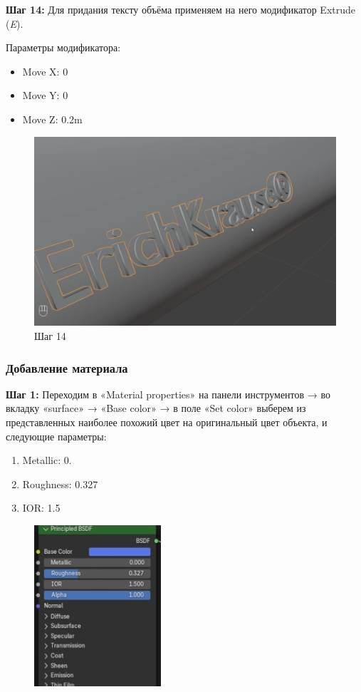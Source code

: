 \documentclass[areasetadvanced]{scrartcl}
\begin{document}
\par \textbf{Шаг 14:} Для придания тексту объёма применяем на него модификатор Extrude (\textit{E}).
\par Параметры модификатора:
\begin{itemize}
    \item Move X: 0
    \item Move Y: 0
    \item Move Z: 0.2m
\end{itemize}

\begin{figure}[H]
    \label{4} 
    \centering
    \includegraphics[width=0.6\linewidth]{col/14.png}
    \caption{Шаг 14}
\end{figure}

\subsubsection{Добавление материала}
\par \textbf{Шаг 1:} Переходим в «Material properties» на панели инструментов → во вкладку «surface» → «Base color» → в поле «Set color» выберем из представленных наиболее похожий цвет на оригинальный цвет объекта, и следующие параметры:
\begin{enumerate}
    \item Metallic: 0.
    \item Roughness: 0.327
    \item IOR: 1.5
\end{enumerate}
\begin{figure}[H]
    \label{4} 
    \centering
    \includegraphics[width=0.4\linewidth]{col/15.png}
\end{figure}
\end{document}
